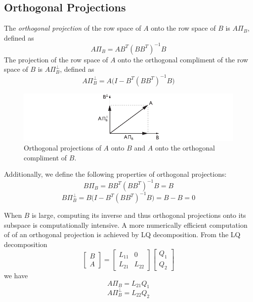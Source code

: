 \subsection{Orthogonal Projections}
The \textit{orthogonal projection} of the row space of $A$ onto the row space of $B$ is $A\Pi_B$, defined as
\begin{equation*}
A\Pi_B = AB^T(BB^T)^{-1}B
\end{equation*}
The projection of the row space of $A$ onto the orthogonal compliment of the row space of $B$ is $A\Pi_B^\perp$, defined as
\begin{equation*}
A\Pi_B^\perp = A\big(I-B^T(BB^T)^{-1}B\big)
\end{equation*}
\begin{figure}[htb!]
	\centering
	\includegraphics{../fig/orthogonal_projection.pdf}
	\caption{Orthogonal projections of $A$ onto $B$ and $A$ onto the orthogonal compliment of $B$.}
\end{figure}

Additionally, we define the following properties of orthogonal projections:
\begin{equation*}
B\Pi_B = BB^T(BB^T)^{-1}B = B
\end{equation*}
\begin{equation*}
B\Pi_B^\perp = B\big(I-B^T(BB^T)^{-1}B\big) = B-B = 0
\end{equation*}

When $B$ is large, computing its inverse and thus orthogonal projections onto its subspace is computationally intensive. A more numerically efficient computation of of an orthogonal projection is achieved by LQ decomposition. From the LQ decomposition
\begin{equation*}
\begin{bmatrix}B\\A\end{bmatrix} = 
\begin{bmatrix}L_{11} & 0\\ L_{21} & L_{22}\end{bmatrix}
\begin{bmatrix}Q_1\\ Q_2\end{bmatrix}
\end{equation*}
we have
\begin{equation*}
A\Pi_B = L_{21}Q_1
\end{equation*}
\begin{equation*}
A\Pi_B^\perp = L_{22}Q_2
\end{equation*}

